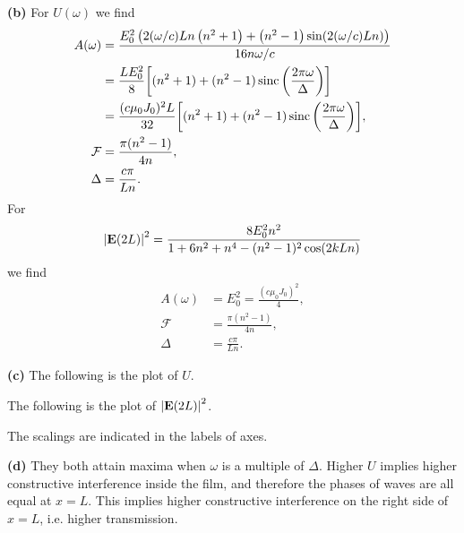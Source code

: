 \documentclass{article}
\makeatletter
\newcommand*{\shifttext}[1]{%
  \settowidth{\@tempdima}{#1}%
  \hspace{-\@tempdima}#1%
}
\newcommand{\plabel}[1]{%
\shifttext{\textbf{#1}\quad}%
}
\makeatother
\begin{document}
\plabel{(b)}%
For $U(\omega)$ we find
\begin{align*}
    A(\omega) &= \frac{E_0^2 \left(2 (\omega/c) L n \left(n^2+1\right)+\left(n^2-1\right) \sin (2 (\omega/c) L n)\right)}{16 n \omega / c} \\
    &= \frac{L E_0^2}{8} \qty[(n^2+1) + (n^2-1) \operatorname{sinc}\qty(\frac{2\pi\omega}{\Delta})] \\
    &= \frac{(c \mu_0 J_0)^2 L}{32}\qty[(n^2+1) + (n^2-1) \operatorname{sinc}\qty(\frac{2\pi \omega}{\Delta})], \\
    \mathcal{F} &= \frac{\pi(n^2-1)}{4n}, \\
    \Delta &= \frac{c\pi}{L n}.
\end{align*}
For
\[ \abs{\vb{E}(2L)}^2 = \frac{8 E_0^2 n^2}{1 + 6n^2 + n^4 - (n^2 - 1)^2 \cos(2 k L n)} \]
we find
\begin{align*}
    A(\omega) &= E_0^2 = \frac{(c \mu_0 J_0)^2}{4}, \\
    \mathcal{F} &= \frac{\pi(n^2-1)}{4n}, \\
    \Delta &= \frac{c\pi}{L n}.
\end{align*}

\plabel{(c)}%
The following is the plot of $U$.
\begin{center}
\end{center}
The following is the plot of $\abs{\vb{E}(2L)}^2$.
\begin{center}
\end{center}
The scalings are indicated in the labels of axes.

\plabel{(d)}%
They both attain maxima when $\omega$ is a multiple of $\Delta$.
Higher $U$ implies higher constructive interference inside the film, and therefore the phases of waves are all equal at $x=L$.
This implies higher constructive interference on the right side of $x=L$, i.e. higher transmission.
\end{document}
